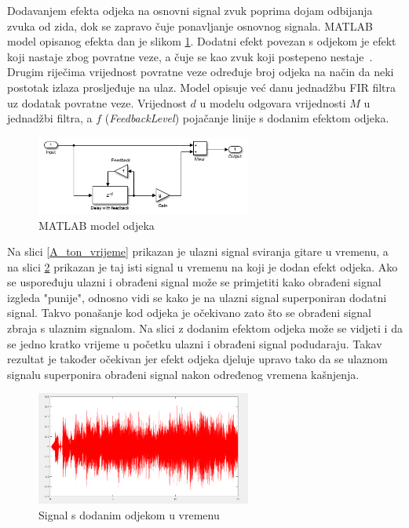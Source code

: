 \documentclass[conference]{IEEEtran}
\begin{document}
Dodavanjem efekta odjeka na osnovni signal zvuk poprima dojam odbijanja zvuka od zida, dok se zapravo čuje
ponavljanje osnovnog signala. MATLAB model opisanog efekta dan je slikom \ref{echo_model}. Dodatni efekt povezan
s odjekom je efekt koji nastaje zbog povratne veze, a čuje se kao zvuk koji postepeno nestaje~\cite{b4}. Drugim riječima
vrijednost povratne veze određuje broj odjeka na način da neki postotak izlaza prosljeđuje na ulaz.
Model opisuje već danu jednadžbu FIR filtra uz dodatak povratne veze. Vrijednost $d$ u modelu odgovara vrijednosti
$M$ u jednadžbi filtra, a $f$ (\textit{FeedbackLevel}) pojačanje linije s dodanim efektom odjeka.

\begin{figure}[H]
    \includegraphics[width=200pt]{slike/echo_matlab.png}
    \centering
    \caption{MATLAB model odjeka}
    \label{echo_model}
\end{figure}

Na slici \ref{A_ton_vrijeme} prikazan je ulazni signal sviranja gitare u vremenu, a na slici \ref{echo_vrijeme}
prikazan je taj isti signal u vremenu na koji je dodan efekt odjeka. Ako se uspoređuju ulazni i obrađeni signal može se
primjetiti kako obrađeni signal izgleda "punije", odnosno vidi se kako je na ulazni signal superponiran dodatni signal.
Takvo ponašanje kod odjeka je očekivano zato što se obrađeni signal zbraja s ulaznim signalom. Na slici z dodanim
efektom odjeka može se vidjeti i da se jedno kratko vrijeme u početku ulazni i obrađeni signal podudaraju. Takav rezultat
je također očekivan jer efekt odjeka djeluje upravo tako da se ulaznom signalu superponira obrađeni signal nakon određenog
vremena kašnjenja.

\begin{figure}[H]
    \includegraphics[width=200pt]{slike/echo_vrijeme.png}
    \centering
    \caption{Signal s dodanim odjekom u vremenu}
    \label{echo_vrijeme}
\end{figure}
\end{document}
